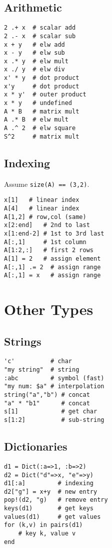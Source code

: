 \documentclass{article}
\begin{document}
\begin{multicols*}{3}
\subsection{Arithmetic}
\vspace*{-2mm}
\begin{verbatim}
2 .+ x  # scalar add
2 .- x  # scalar sub 
x + y   # elw add
x - y   # elw sub
x .* y  # elw mult
x ./ y  # elw div 
x' * y  # dot product
x'y     # dot product
x * y'  # outer product
x * y   # undefined
A * B   # matrix mult
A .* B  # elw mult
A .^ 2  # elw square
S^2     # matrix mult 
\end{verbatim}

\subsection{Indexing}
\vspace*{-2mm}
Assume \texttt{size(A) == (3,2)}.
\vspace*{-2mm}
\begin{verbatim}
x[1]   # linear index
A[4]   # linear index
A[1,2] # row,col (same)
x[2:end]   # 2nd to last
x[1:end-2] # 1st to 3rd last
A[:,1]     # 1st column
A[1:2,:]   # first 2 rows
A[1] = 2   # assign element
A[:,1] .= 2  # assign range
A[:,1] = x   # assign range
\end{verbatim}

\section{Other Types}
\subsection{Strings}
\vspace*{-2mm}
\begin{verbatim}
'c'          # char
"my string"  # string
:abc         # symbol (fast)
"my num: $a" # interpolation
string("a","b") # concat
"a" * "b1"      # concat
s[1]            # get char
s[1:2]          # sub-string
\end{verbatim}

\subsection{Dictionaries}
\vspace{-2mm}
\begin{verbatim} 
d1 = Dict(:a=>1, :b=>2)
d2 = Dict("d"=>x, "e"=>y)
d1[:a]         # indexing
d2["g"] = x+y  # new entry 
pop!(d2, "g)   # remove entry
keys(d1)       # get keys
values(d1)     # get values
for (k,v) in pairs(d1) 
    # key k, value v 
end
\end{verbatim}


\end{multicols*}
\end{document}
